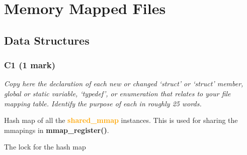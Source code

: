 \documentclass{report}
\newcommand{\question}[1]{\textit{#1} \ }
\newcommand{\fun}[1]{\textcolor{Emerald}{\textbf{#1}}}
\newcommand{\file}[1]{\textcolor{YellowGreen}{\textbf{#1}}}
\newcommand{\struct}[1]{\textcolor{orange}{\textbf{#1}}}
\newcommand{\pintoscode}[4]{}
\newcommand{\pintosfile}[3]{\pintoscode{#1}{#2}{\file{#3}}{#3}}
\begin{document}
{				

	\section*{Memory Mapped Files}
		\subsection*{Data Structures}
			\subsubsection*{C1 (1 mark)}
				\question{Copy here the declaration of each new or changed `struct' or 
				`struct' member, global or static variable, `typedef', or 
				enumeration that relates to your file mapping table. Identify 
				the purpose of each in roughly 25 words.}
				
				\pintosfile{37}{37}{mmap.c}
				Hash map of all the \struct{shared\_mmap} instances. This is used for 
				sharing the mmapings in \fun{mmap\_register()}.

				\pintosfile{40}{40}{mmap.c} 
				The lock for the hash map
				
}
\end{document}
